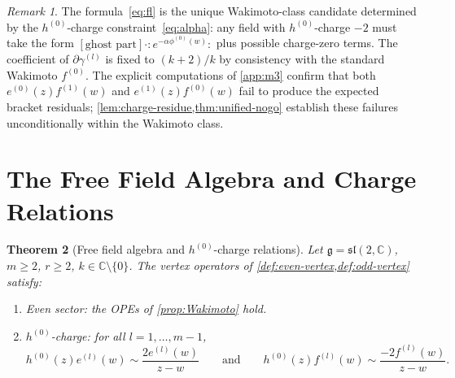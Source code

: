 \documentclass[12pt]{article}
\theoremstyle{plain}
\newtheorem{theorem}{Theorem}[section]
\theoremstyle{definition}
\theoremstyle{remark}
\newtheorem{remark}[theorem]{Remark}
\newcommand{\C}{\mathbb{C}}
\newcommand{\g}{\mathfrak{g}}
\newcommand{\sltwo}{\mathfrak{sl}(2,\C)}
\newcommand{\gl}[1]{\gamma^{(#1)}}
\newcommand{\el}[1]{e^{(#1)}}
\newcommand{\hl}[1]{h^{(#1)}}
\newcommand{\fl}[1]{f^{(#1)}}
\newcommand{\OPE}{\sim}
\newcommand{\no}[1]{:\!#1\!:}
\begin{document}
\begin{remark}\label{rem:fl-unique}
  The formula~\eqref{eq:fl} is the unique Wakimoto-class candidate determined by
  the $h^{(0)}$-charge constraint~\eqref{eq:alpha}: any field with $h^{(0)}$-charge
  $-2$ must take the form $[\text{ghost part}]\cdot\no{e^{-\alpha\phi^{(0)}(w)}}$
  plus possible charge-zero terms.
  The coefficient of $\partial\gl{l}$ is fixed to $(k+2)/k$ by consistency with
  the standard Wakimoto $f^{(0)}$.
  The explicit computations of \cref{app:m3} confirm that both
  $e^{(0)}(z)f^{(1)}(w)$ and $e^{(1)}(z)f^{(0)}(w)$ fail to produce the
  expected bracket residuals; \cref{lem:charge-residue,thm:unified-nogo}
  establish these failures unconditionally within the Wakimoto class.
\end{remark}
\section{The Free Field Algebra and Charge Relations}\label{sec:TypeI}
\begin{theorem}[Free field algebra and $h^{(0)}$-charge relations]
\label{thm:main-TypeI}
  Let $\g=\sltwo$, $m\geq 2$, $r\geq 2$, $k\in\C\setminus\{0\}$.
  The vertex operators of \cref{def:even-vertex,def:odd-vertex} satisfy:
  \begin{enumerate}[label=\textup{(\Roman*)}]
    \item\label{CR0}
      \emph{Even sector}: the OPEs of \cref{prop:Wakimoto} hold.
    \item\label{CRh}
      \emph{$h^{(0)}$-charge}: for all $l=1,\ldots,m-1$,
      \[
        \hl{0}(z)\el{l}(w)\OPE\frac{2\el{l}(w)}{z-w}
        \qquad\text{and}\qquad
        \hl{0}(z)\fl{l}(w)\OPE\frac{-2\fl{l}(w)}{z-w}.
      \]
  \end{enumerate}
\end{theorem}
\end{document}
